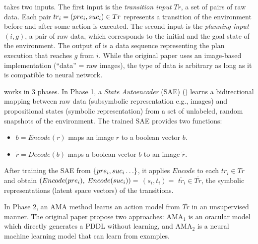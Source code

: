 \latentplanner takes two inputs.
The first input is the \emph{transition input} $Tr$, a set of pairs of raw data.
Each pair $tr_i=(pre_i, suc_i) \in Tr$ represents a transition of the environment before and after some action is executed.
The second input is the \emph{planning input} $(i, g)$, a pair of raw data, which corresponds to the initial and the goal state of the environment.
The output of \latentplanner is a data sequence representing the plan execution that reaches $g$ from $i$.
While the original paper uses an image-based implementation (``data'' = raw images),
the type of data is arbitrary as long as it is compatible to neural network.


\latentplanner works in 3 phases.
In Phase 1, a \emph{State Autoencoder} (SAE) () learns a bidirectional mapping between raw data (subsymbolic representation e.g., images)
 and propositional states (symbolic representation) from a set of unlabeled, random snapshots of the environment.
The trained SAE provides two functions:
\begin{itemize} %
\setlength{\itemsep}{-0.3em}
\item $b=Encode(r)$ maps an image  $r$ to a boolean vector $b$.
\item $\tilde{r}=Decode(b)$ maps a boolean vector $b$ to an image $\tilde{r}$.
\end{itemize}
After training the SAE from ${\left\{pre_i, suc_i\ldots\right\}}$,
it applies $Encode$ to each $tr_i \in Tr$ and obtain $(Encode(pre_i),$ $Encode(suc_i))=$ $(s_i,t_i)=$ $\overline{tr}_i\in \overline{Tr}$,
the symbolic representations (latent space vectors) of the transitions.

In Phase 2, an AMA method learns an action model from $\overline{Tr}$ in an unsupervised manner.
The original paper propose two approaches: AMA$_1$ is an oracular model which directly generates a PDDL without learning,
and AMA$_2$ is a neural machine learning model that can learn from examples.

